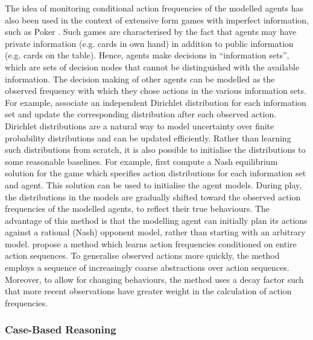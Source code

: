 \documentclass[final,1p,times,authoryear]{elsarticle}
\begin{document}
The idea of monitoring conditional action frequencies of the modelled agents has also been used in the context of extensive form games with imperfect information, such as Poker \citep{ms2017,gs2011,sbl2005,bdsb2004}. Such games are characterised by the fact that agents may have private information (e.g. cards in own hand) in addition to public information (e.g. cards on the table). Hence, agents make decisions in ``information sets'', which are sets of decision nodes that cannot be distinguished with the available information. The decision making of other agents can be modelled as the observed frequency with which they chose actions in the various information sets. For example, \citet{sbl2005} associate an independent Dirichlet distribution for each information set and update the corresponding distribution after each observed action. Dirichlet distributions are a natural way to model uncertainty over finite probability distributions and can be updated efficiently. Rather than learning such distributions from scratch, it is also possible to initialise the distributions to some reasonable baselines. For example, \citet{gs2011} first compute a Nash equilibrium solution for the game which specifies action distributions for each information set and agent. This solution can be used to initialise the agent models. During play, the distributions in the models are gradually shifted toward the observed action frequencies of the modelled agents, to reflect their true behaviours. The advantage of this method is that the modelling agent can initially plan its actions against a rational (Nash) opponent model, rather than starting with an arbitrary model. \citet{bdsb2004} propose a method which learns action frequencies conditioned on entire action sequences. To generalise observed actions more quickly, the method employs a sequence of increasingly coarse abstractions over action sequences. Moreover, to allow for changing behaviours, the method uses a decay factor such that more recent observations have greater weight in the calculation of action frequencies.


		\subsubsection{Case-Based Reasoning} \label{sec:policyrec-casebased}
\end{document}
